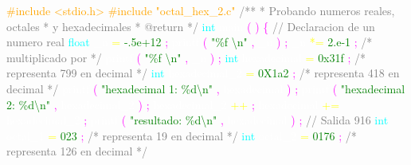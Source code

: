 \justifying \small 

\textcolor{orange}{\#include <stdio.h>} 
\textcolor{orange}{\#include "octal\_hex\_2.c"} 
\textcolor{gray}{/**
 * Probando numeros reales, octales
 * y hexadecimales
 * @return
 */} 
\textcolor{cyan}{int} 
\textcolor{white}{main} 
\textcolor{magenta}{(} 
\textcolor{magenta}{)} 
\textcolor{magenta}{\{} 
\textcolor{gray}{// Declaracion de un numero real} 
\textcolor{cyan}{float} 
\textcolor{white}{\_n} 
\textcolor{yellow}{=} 
\textcolor{green}{-.5e+12} 
\textcolor{magenta}{;} 
\textcolor{white}{printf} 
\textcolor{magenta}{(} 
\textcolor{green}{"\%f \textbackslash n"} 
\textcolor{magenta}{,} 
\textcolor{white}{\_n} 
\textcolor{magenta}{)} 
\textcolor{magenta}{;} 
\textcolor{white}{\_n} 
\textcolor{yellow}{*=} 
\textcolor{green}{2.e-1} 
\textcolor{magenta}{;} 
\textcolor{gray}{/* multiplicado por  */} 
\textcolor{white}{printf} 
\textcolor{magenta}{(} 
\textcolor{green}{"\%f \textbackslash n"} 
\textcolor{magenta}{,} 
\textcolor{white}{\_n} 
\textcolor{magenta}{)} 
\textcolor{magenta}{;} 
\textcolor{cyan}{int} 
\textcolor{white}{hexadecimal} 
\textcolor{yellow}{=} 
\textcolor{green}{0x31f} 
\textcolor{magenta}{;} 
\textcolor{gray}{/* representa 799 en decimal */} 
\textcolor{cyan}{int} 
\textcolor{white}{hexadecimal\_2} 
\textcolor{yellow}{=} 
\textcolor{green}{0X1a2} 
\textcolor{magenta}{;} 
\textcolor{gray}{/* representa 418 en decimal */} 
\textcolor{white}{printf} 
\textcolor{magenta}{(} 
\textcolor{green}{"hexadecimal 1: \%d\textbackslash n"} 
\textcolor{magenta}{,} 
\textcolor{white}{hexadecimal} 
\textcolor{magenta}{)} 
\textcolor{magenta}{;} 
\textcolor{white}{printf} 
\textcolor{magenta}{(} 
\textcolor{green}{"hexadecimal 2: \%d\textbackslash n"} 
\textcolor{magenta}{,} 
\textcolor{white}{hexadecimal\_2} 
\textcolor{magenta}{)} 
\textcolor{magenta}{;} 
\textcolor{white}{hexadecimal\_2} 
\textcolor{yellow}{++} 
\textcolor{magenta}{;} 
\textcolor{white}{hexadecimal} 
\textcolor{yellow}{+=} 
\textcolor{white}{hexadecimal\_2} 
\textcolor{magenta}{;} 
\textcolor{white}{printf} 
\textcolor{magenta}{(} 
\textcolor{green}{"resultado: \%d\textbackslash n"} 
\textcolor{magenta}{,} 
\textcolor{white}{hexadecimal} 
\textcolor{magenta}{)} 
\textcolor{magenta}{;} 
\textcolor{gray}{// Salida 916} 
\textcolor{cyan}{int} 
\textcolor{white}{octal\_1} 
\textcolor{yellow}{=} 
\textcolor{green}{023} 
\textcolor{magenta}{;} 
\textcolor{gray}{/* representa 19 
    en decimal */} 
\textcolor{cyan}{int} 
\textcolor{white}{octal\_2} 
\textcolor{yellow}{=} 
\textcolor{green}{0176} 
\textcolor{magenta}{;} 
\textcolor{gray}{/* representa 126
    en decimal */} 
